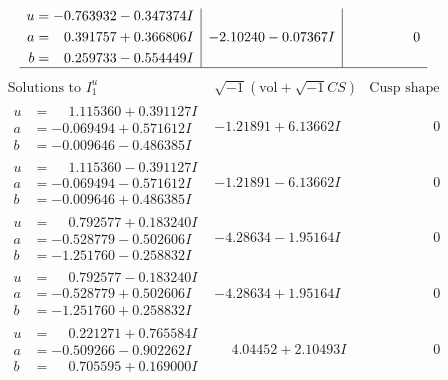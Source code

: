 \documentclass[1p]{elsarticle_modified}
\theoremstyle{definition}
\newcommand{\I}{\sqrt{-1}}
\begin{document}
$$\begin{array}{c|c|c}
\begin{aligned}
u &= -0.763932 - 0.347374 I \\
a &= \phantom{-}0.391757 + 0.366806 I \\
b &= \phantom{-}0.259733 - 0.554449 I\end{aligned}
 & -2.10240 - 0.07367 I & \phantom{-0.000000 } 0\\
 \hline 
 \end{array}$$\newpage$$\begin{array}{c|c|c}  
\text{Solutions to }I^u_{1}& \I (\text{vol} + \sqrt{-1}CS) & \text{Cusp shape}\\
 \hline 
\begin{aligned}
u &= \phantom{-}1.115360 + 0.391127 I \\
a &= -0.069494 + 0.571612 I \\
b &= -0.009646 - 0.486385 I\end{aligned}
 & -1.21891 + 6.13662 I & \phantom{-0.000000 } 0 \\ \hline\begin{aligned}
u &= \phantom{-}1.115360 - 0.391127 I \\
a &= -0.069494 - 0.571612 I \\
b &= -0.009646 + 0.486385 I\end{aligned}
 & -1.21891 - 6.13662 I & \phantom{-0.000000 } 0 \\ \hline\begin{aligned}
u &= \phantom{-}0.792577 + 0.183240 I \\
a &= -0.528779 - 0.502606 I \\
b &= -1.251760 - 0.258832 I\end{aligned}
 & -4.28634 - 1.95164 I & \phantom{-0.000000 } 0 \\ \hline\begin{aligned}
u &= \phantom{-}0.792577 - 0.183240 I \\
a &= -0.528779 + 0.502606 I \\
b &= -1.251760 + 0.258832 I\end{aligned}
 & -4.28634 + 1.95164 I & \phantom{-0.000000 } 0 \\ \hline\begin{aligned}
u &= \phantom{-}0.221271 + 0.765584 I \\
a &= -0.509266 - 0.902262 I \\
b &= \phantom{-}0.705595 + 0.169000 I\end{aligned}
 & \phantom{-}4.04452 + 2.10493 I & \phantom{-0.000000 } 0 \\ \hline\begin{aligned}

\end{aligned}
\end{array}$$
\end{document}
